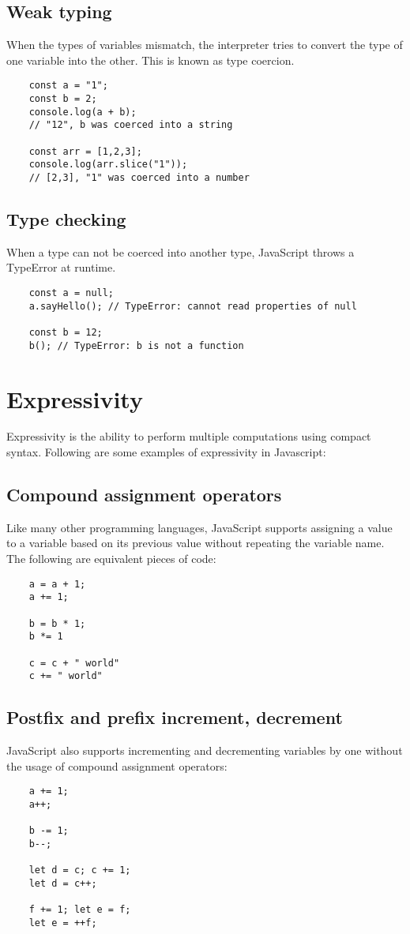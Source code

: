 \documentclass[11pt,a4paper]{article}
\begin{document}
\subsection{Weak typing}
When the types of variables mismatch, the interpreter tries to convert the type of one variable into the other.
This is known as type coercion.
\begin{verbatim}
    const a = "1";
    const b = 2;
    console.log(a + b);
    // "12", b was coerced into a string

    const arr = [1,2,3];
    console.log(arr.slice("1"));
    // [2,3], "1" was coerced into a number
\end{verbatim}

\subsection{Type checking}
When a type can not be coerced into another type, JavaScript throws a TypeError at runtime.
\begin{verbatim}
    const a = null;
    a.sayHello(); // TypeError: cannot read properties of null

    const b = 12;
    b(); // TypeError: b is not a function
\end{verbatim}

\section{Expressivity}
Expressivity is the ability to perform multiple computations using compact syntax.
Following are some examples of expressivity in Javascript:

\subsection{Compound assignment operators}
Like many other programming languages, JavaScript supports assigning a value to a variable based on its previous value
without repeating the variable name. The following are equivalent pieces of code:
\begin{verbatim}
    a = a + 1;
    a += 1;

    b = b * 1;
    b *= 1

    c = c + " world"
    c += " world"
\end{verbatim}

\subsection{Postfix and prefix increment, decrement}
JavaScript also supports incrementing and decrementing variables by one without the usage of compound assignment
operators:
\begin{verbatim}
    a += 1;
    a++;

    b -= 1;
    b--;

    let d = c; c += 1;
    let d = c++;

    f += 1; let e = f;
    let e = ++f;
\end{verbatim}
\end{document}

